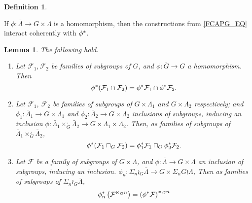 \documentclass[a4paper,10pt
,draft
]{article}%
\numberwithin{equation}{section}
\numberwithin{figure}{section}
\newtheorem{lemma}[equation]{Lemma}%
\theoremstyle{definition} %
\newtheorem{definition}[equation]{Definition}%
\newcommand{\set}[1]{\left\{#1\right\}}%
\newcommand{\F}{\ensuremath{\mathcal F}}
\newcommand{\1}{\ensuremath{\mathbbm 1}}%
\begin{document}
{\begin{definition}
  \end{definition}

  If $\phi \colon \bar \Lambda \to G \times \Lambda$ is a homomorphism, then
  the constructions from \eqref{FCAPG_EQ} interact coherently with $\phi^{\**}$.
  \begin{lemma}
        \label{FGCAPFAM_LEM}
        The following hold.
        \begin{enumerate}[label=(\roman*)]
        \item Let $\F_1,\F_2$ be families of subgroups of $G$, and $\phi \colon \bar G \to G$ a homomorphism. Then
              \[
                    \phi^{\**}(\F_1 \cap \F_2) = \phi^{\**}\F_1 \cap \phi^{\**}\F_2.
              \]
        \item Let $\F_1$, $\F_2$ be families of subgroups of $G \times \Lambda_1$ and $G \times \Lambda_2$ respectively; and
              $\phi_1 \colon \bar \Lambda_1 \to G \times \Lambda_1$ and
              $\phi_2 \colon \bar \Lambda_2 \to G \times \Lambda_2$ inclusions of subgroups,
              inducing an inclusion
              $\phi \colon \bar \Lambda_1 \times_G^\lrcorner \bar \Lambda_2 \to G \times \Lambda_1 \times \Lambda_2$.
              Then, as families of subgroups of $\bar \Lambda_1 \times_G^\lrcorner \bar \Lambda_2$,
              \[
                    \phi^{\**}(\F_1 \sqcap_G \F_2) = \phi_1^{\**} \F_1 \sqcap_G \phi_2^{\**} \F_2.
              \]
        \item Let $\F$ be a family of subgroups of $G \times \Lambda$, and
              $\phi \colon \bar \Lambda \to G \times \Lambda$ an inclusion of subgroups, inducing an inclusion.
              $\phi_n \colon \Sigma_n \wr_G \bar \Lambda \to G \times \Sigma_nG \wr \Lambda$,
              Then as families of subgroups of $\Sigma_n \wr_G \bar \Lambda$,
              \[
                    \phi_n^{\**}\left( \F^{\ltimes_G n} \right) = \left(\phi^{\**} \F\right)^{\ltimes_G n}
              \]


\end{enumerate}
\end{lemma}}
\end{document}
